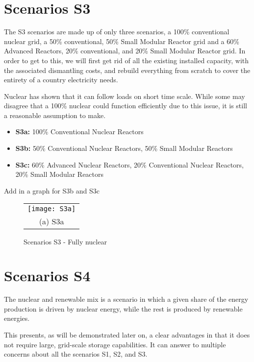 \section{Scenarios S3}

The S3 scenarios are made up of only three scenarios, a 100\% conventional nuclear grid, a 50\% conventional, 50\% Small Modular Reactor grid and a 60\% Advanced Reactors, 20\% conventional, and 20\% Small Modular Reactor grid. In order to get to this, we will first get rid of all the existing installed capacity, with the associated dismantling costs, and rebuild everything from scratch to cover the entirety of a country electricity needs.

Nuclear has shown that it can follow loads on short time scale. While some may disagree that a 100\% nuclear could function efficiently due to this issue, it is still a reasonable assumption to make.


\begin{kaobox}[frametitle=S3 scenarios]
\begin{itemize}
	\item \textbf{S3a:} 100\% Conventional Nuclear Reactors
	\item \textbf{S3b:} 50\% Conventional Nuclear Reactors, 50\% Small Modular Reactors
	\item \textbf{S3c:} 60\% Advanced Nuclear Reactors, 20\% Conventional Nuclear Reactors, 20\% Small Modular Reactors
\end{itemize}
\end{kaobox}

Add in a graph for S3b and S3c


\begin{figure*}
\begin{tabular}{cc}
  \multicolumn{2}{c}{\texttt{[image: S3a]} }\\
\multicolumn{2}{c}{(a) S3a}
\end{tabular}
\caption{Scenarios S3 - Fully nuclear}
\end{figure*}


\section{Scenarios S4}

The nuclear and renewable mix is a scenario in which a given share of the energy production is driven by nuclear energy, while the rest is produced by renewable energies.

This presents, as will be demonstrated later on, a clear advantages in that it does not require large, grid-scale storage capabilities. It can answer to multiple concerns about all the scenarios S1, S2, and S3.


